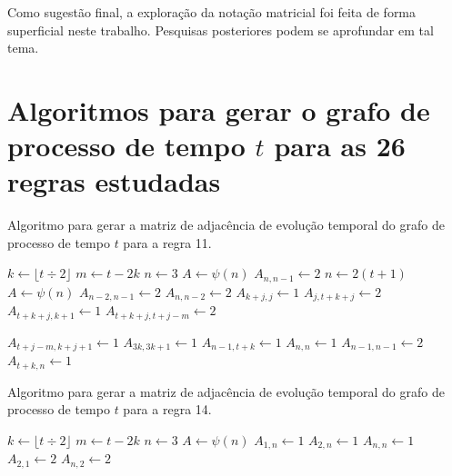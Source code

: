 \documentclass[12pt,a4paper]{article}
\begin{document}
Como sugestão final, a exploração da notação matricial foi feita de forma
superficial neste trabalho.  Pesquisas posteriores podem se aprofundar em
tal tema.

\newpage

\def\refname{Referências bibliográficas}



\appendix
\section{Algoritmos para gerar o grafo de processo de tempo $t$ para as 26 regras
estudadas}\label{sec:algorithms}

\begin{algorithm}[H]
\caption{Algoritmo para gerar a matriz de adjacência de evolução temporal do
grafo de processo de tempo $t$ para a regra 11.}
\label{alg:r11}
\begin{algorithmic}
\STATE $k \leftarrow \lfloor t \div 2 \rfloor$
\STATE $m \leftarrow t-2k$
    \STATE $n \leftarrow 3$
    \STATE $A \leftarrow \psi(n)$
    \STATE $A_{n,n-1} \leftarrow 2$
\ELSE
    \STATE $n \leftarrow 2(t+1)$
    \STATE $A \leftarrow \psi(n)$
    \STATE $A_{n-2,n-1} \leftarrow 2$
    \STATE $A_{n,n-2} \leftarrow 2$
        \STATE $A_{k+j,j} \leftarrow 1$
        \STATE $A_{j,t+k+j} \leftarrow 2$
    \ENDFOR
        \STATE $A_{t+k+j,k+1} \leftarrow 1$
    \ENDFOR
            \STATE $A_{t+k+j,t+j-m} \leftarrow 2$
        \ENDFOR
    \ENDIF
{}
\end{algorithmic}
\end{algorithm}

\begin{algorithm}[H]
\begin{algorithmic}
            \STATE $A_{t+j-m,k+j+1} \leftarrow 1$
        \ENDFOR
    \ENDIF
        \STATE $A_{3k,3k+1} \leftarrow 1$
    \ENDIF
\ENDIF
\STATE $A_{n-1,t+k} \leftarrow 1$
\STATE $A_{n,n} \leftarrow 1$
\STATE $A_{n-1,n-1} \leftarrow 2$
\STATE $A_{t+k,n} \leftarrow 1$
\end{algorithmic}
\end{algorithm}

\begin{algorithm}[H]
\caption{Algoritmo para gerar a matriz de adjacência de evolução temporal do
grafo de processo de tempo $t$ para a regra 14.}
\label{alg:r14}
\begin{algorithmic}
\STATE $k \leftarrow \lfloor t \div 2 \rfloor$
\STATE $m \leftarrow t-2k$
    \STATE $n \leftarrow 3$
    \STATE $A \leftarrow \psi(n)$
    \STATE $A_{1,n} \leftarrow 1$
    \STATE $A_{2,n} \leftarrow 1$
    \STATE $A_{n,n} \leftarrow 1$
    \STATE $A_{2,1} \leftarrow 2$
    \STATE $A_{n,2} \leftarrow 2$
\ELSE
{}
\end{algorithmic}
\end{algorithm}
\end{document}
